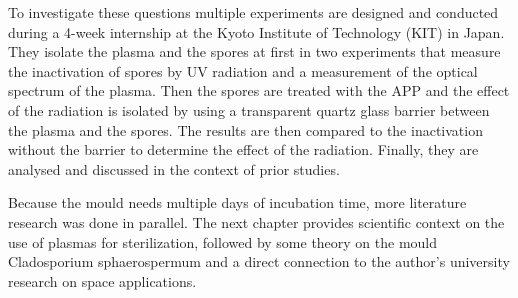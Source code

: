 To investigate these questions multiple experiments are designed and conducted during a 4-week internship at the Kyoto Institute of Technology (KIT) in Japan. They isolate the plasma and the spores at first in two experiments that measure the inactivation of spores by UV radiation and a measurement of the optical spectrum of the plasma. Then the spores are treated with the APP and the effect of the radiation is isolated by using a transparent quartz glass barrier between the plasma and the spores. The results are then compared to the inactivation without the barrier to determine the effect of the radiation. Finally, they are analysed and discussed in the context of prior studies.

Because the mould needs multiple days of incubation time, more literature research was done in parallel. The next chapter provides scientific context on the use of plasmas for sterilization, followed by some theory on the mould Cladosporium sphaerospermum and a direct connection to the author's university research on space applications.